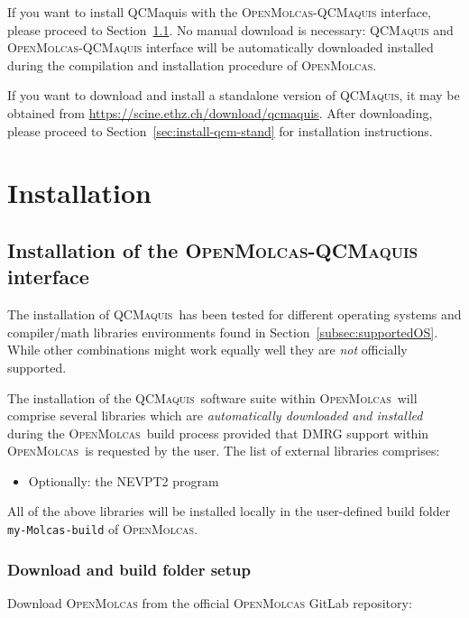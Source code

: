 \documentclass[bibliography=totoc,12pt,a4paper]{scrartcl}
\newcommand{\mol}{\textsc{OpenMolcas}}
\newcommand{\qcm}{\textsc{QCMaquis}}
\begin{document}
If you want to install QCMaquis with the \mol-\qcm{} interface, please proceed to Section~\ref{sec:install-qcm-mol}. No manual download is necessary: \qcm{} and \mol-\qcm{} interface will be automatically downloaded installed during the compilation and installation procedure of \mol{}.

If you want to download and install a standalone version of \qcm{}, it may be obtained from \url{https://scine.ethz.ch/download/qcmaquis}. After downloading, please proceed to Section~\ref{sec:install-qcm-stand} for installation instructions.


\clearpage
\newpage
\section{Installation}\label{sec:installation}


\subsection{Installation of the \mol-\qcm{} interface}\label{sec:install-qcm-mol}

The installation of \qcm\ has been tested for different
operating systems and compiler/math libraries environments found in Section~\ref{subsec:supportedOS}.
While other combinations might work equally well they are \emph{not} officially supported.

\noindent The installation of the \qcm\ software suite within \mol\ will
comprise several libraries which are \emph{automatically downloaded and installed} during the \mol\ build
process provided that DMRG support within \mol\ is requested by the user.
The list of external libraries comprises:
\begin{itemize}
\item Optionally: the NEVPT2 program
\end{itemize}
All of the above libraries will be installed locally in the user-defined build folder \texttt{my-Molcas-build} of \mol.


\subsubsection{Download and build folder setup}
Download \mol{} from the official \mol{} GitLab repository:
\end{document}
